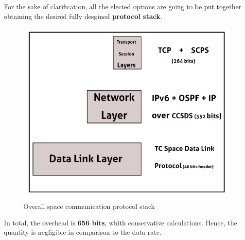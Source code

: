 For the sake of clarification, all the elected options are going to be put together obtaining the desired fully desgined \textbf{protocol stack}.

\begin{figure}[H]
\centering
\includegraphics[scale=0.8]{./sections/CommunicationsDept/results2}
\caption{Overall space communication protocol stack }
\label{fig:osi}
\end{figure}

In total, the overhead is \textbf{656 bits}, whith conservative calculations. Hence, the quantity is negligible in comparison to the data rate. 